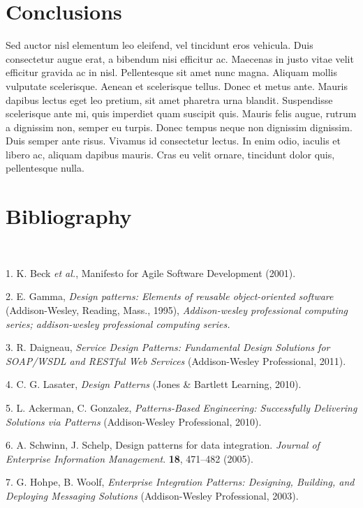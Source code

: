 \documentclass[final]{beamer}
\begin{document}
\begin{frame}[t]
\begin{multicols}{3}
\section{Conclusions}\label{conclusions}

Sed auctor nisl elementum leo eleifend, vel tincidunt eros vehicula.
Duis consectetur augue erat, a bibendum nisi efficitur ac. Maecenas in
justo vitae velit efficitur gravida ac in nisl. Pellentesque sit amet
nunc magna. Aliquam mollis vulputate scelerisque. Aenean et scelerisque
tellus. Donec et metus ante. Mauris dapibus lectus eget leo pretium, sit
amet pharetra urna blandit. Suspendisse scelerisque ante mi, quis
imperdiet quam suscipit quis. Mauris felis augue, rutrum a dignissim
non, semper eu turpis. Donec tempus neque non dignissim dignissim. Duis
semper ante risus. Vivamus id consectetur lectus. In enim odio, iaculis
et libero ac, aliquam dapibus mauris. Cras eu velit ornare, tincidunt
dolor quis, pellentesque nulla.

\section{Bibliography}\label{bibliography}

~

1. K. Beck \emph{et al.}, Manifesto for Agile Software Development
(2001).

2. E. Gamma, \emph{Design patterns: Elements of reusable object-oriented
software} (Addison-Wesley, Reading, Mass., 1995), \emph{Addison-wesley
professional computing series; addison-wesley professional computing
series.}

3. R. Daigneau, \emph{Service Design Patterns: Fundamental Design
Solutions for SOAP/WSDL and RESTful Web Services} (Addison-Wesley
Professional, 2011).

4. C. G. Lasater, \emph{Design Patterns} (Jones \& Bartlett Learning,
2010).

5. L. Ackerman, C. Gonzalez, \emph{Patterns-Based Engineering:
Successfully Delivering Solutions via Patterns} (Addison-Wesley
Professional, 2010).

6. A. Schwinn, J. Schelp, Design patterns for data integration.
\emph{Journal of Enterprise Information Management}. \textbf{18},
471--482 (2005).

7. G. Hohpe, B. Woolf, \emph{Enterprise Integration Patterns: Designing,
Building, and Deploying Messaging Solutions} (Addison-Wesley
Professional, 2003).



\end{multicols}
\end{frame}
\end{document}
